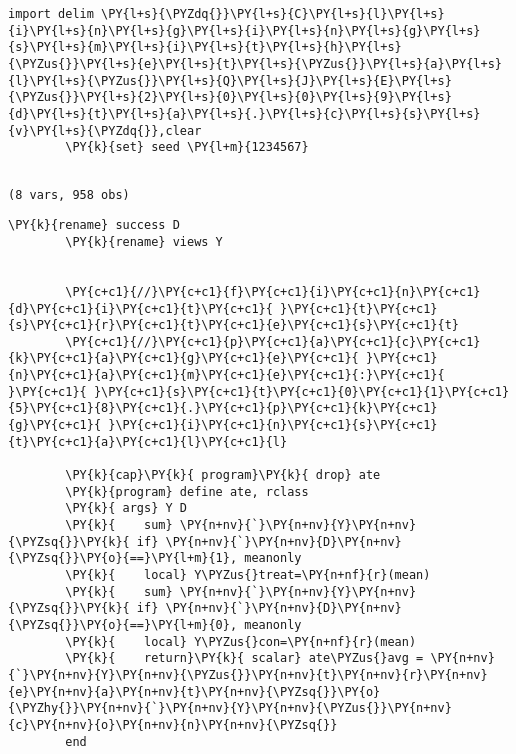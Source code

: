 \documentclass[11pt,notitlepage]{article}\usepackage[]{graphicx}\usepackage[]{color}
\makeatletter
\newenvironment{kframe}{%
 \def\at@end@of@kframe{}%
 \ifinner\ifhmode%
  \def\at@end@of@kframe{\end{minipage}}%
  \begin{minipage}{\columnwidth}%
 \fi\fi%
 \def\FrameCommand##1{\hskip\@totalleftmargin \hskip-\fboxsep
 \colorbox{shadecolor}{##1}\hskip-\fboxsep
     \hskip-\linewidth \hskip-\@totalleftmargin \hskip\columnwidth}%
 \MakeFramed {\advance\hsize-\width
   \@totalleftmargin\z@ \linewidth\hsize
   \@setminipage}}%
 {\par\unskip\endMakeFramed%
 \at@end@of@kframe}
\newenvironment{knitrout}{}{} %
\makeatother
\begin{document}
\begin{knitrout}
\color{fgcolor}\begin{kframe}
  
   \begin{Verbatim}[commandchars=\\\{\}]
	import delim \PY{l+s}{\PYZdq{}}\PY{l+s}{C}\PY{l+s}{l}\PY{l+s}{i}\PY{l+s}{n}\PY{l+s}{g}\PY{l+s}{i}\PY{l+s}{n}\PY{l+s}{g}\PY{l+s}{s}\PY{l+s}{m}\PY{l+s}{i}\PY{l+s}{t}\PY{l+s}{h}\PY{l+s}{\PYZus{}}\PY{l+s}{e}\PY{l+s}{t}\PY{l+s}{\PYZus{}}\PY{l+s}{a}\PY{l+s}{l}\PY{l+s}{\PYZus{}}\PY{l+s}{Q}\PY{l+s}{J}\PY{l+s}{E}\PY{l+s}{\PYZus{}}\PY{l+s}{2}\PY{l+s}{0}\PY{l+s}{0}\PY{l+s}{9}\PY{l+s}{d}\PY{l+s}{t}\PY{l+s}{a}\PY{l+s}{.}\PY{l+s}{c}\PY{l+s}{s}\PY{l+s}{v}\PY{l+s}{\PYZdq{}},clear
        \PY{k}{set} seed \PY{l+m}{1234567}
\end{Verbatim}
  \begin{Verbatim}[commandchars=\\\{\}]

(8 vars, 958 obs)

    \end{Verbatim}

    \begin{Verbatim}[commandchars=\\\{\}]
	\PY{k}{rename} success D
        \PY{k}{rename} views Y
        
        
        \PY{c+c1}{//}\PY{c+c1}{f}\PY{c+c1}{i}\PY{c+c1}{n}\PY{c+c1}{d}\PY{c+c1}{i}\PY{c+c1}{t}\PY{c+c1}{ }\PY{c+c1}{t}\PY{c+c1}{s}\PY{c+c1}{r}\PY{c+c1}{t}\PY{c+c1}{e}\PY{c+c1}{s}\PY{c+c1}{t}
        \PY{c+c1}{//}\PY{c+c1}{p}\PY{c+c1}{a}\PY{c+c1}{c}\PY{c+c1}{k}\PY{c+c1}{a}\PY{c+c1}{g}\PY{c+c1}{e}\PY{c+c1}{ }\PY{c+c1}{n}\PY{c+c1}{a}\PY{c+c1}{m}\PY{c+c1}{e}\PY{c+c1}{:}\PY{c+c1}{ }\PY{c+c1}{ }\PY{c+c1}{s}\PY{c+c1}{t}\PY{c+c1}{0}\PY{c+c1}{1}\PY{c+c1}{5}\PY{c+c1}{8}\PY{c+c1}{.}\PY{c+c1}{p}\PY{c+c1}{k}\PY{c+c1}{g}\PY{c+c1}{ }\PY{c+c1}{i}\PY{c+c1}{n}\PY{c+c1}{s}\PY{c+c1}{t}\PY{c+c1}{a}\PY{c+c1}{l}\PY{c+c1}{l}
        
        \PY{k}{cap}\PY{k}{ program}\PY{k}{ drop} ate
        \PY{k}{program} define ate, rclass
        \PY{k}{	args} Y D
        \PY{k}{    sum} \PY{n+nv}{`}\PY{n+nv}{Y}\PY{n+nv}{\PYZsq{}}\PY{k}{ if} \PY{n+nv}{`}\PY{n+nv}{D}\PY{n+nv}{\PYZsq{}}\PY{o}{==}\PY{l+m}{1}, meanonly
        \PY{k}{    local} Y\PYZus{}treat=\PY{n+nf}{r}(mean)
        \PY{k}{    sum} \PY{n+nv}{`}\PY{n+nv}{Y}\PY{n+nv}{\PYZsq{}}\PY{k}{ if} \PY{n+nv}{`}\PY{n+nv}{D}\PY{n+nv}{\PYZsq{}}\PY{o}{==}\PY{l+m}{0}, meanonly
        \PY{k}{    local} Y\PYZus{}con=\PY{n+nf}{r}(mean)
        \PY{k}{    return}\PY{k}{ scalar} ate\PYZus{}avg = \PY{n+nv}{`}\PY{n+nv}{Y}\PY{n+nv}{\PYZus{}}\PY{n+nv}{t}\PY{n+nv}{r}\PY{n+nv}{e}\PY{n+nv}{a}\PY{n+nv}{t}\PY{n+nv}{\PYZsq{}}\PY{o}{\PYZhy{}}\PY{n+nv}{`}\PY{n+nv}{Y}\PY{n+nv}{\PYZus{}}\PY{n+nv}{c}\PY{n+nv}{o}\PY{n+nv}{n}\PY{n+nv}{\PYZsq{}}
        end
        

\end{Verbatim}
\end{kframe}
\end{knitrout}
\end{document}
